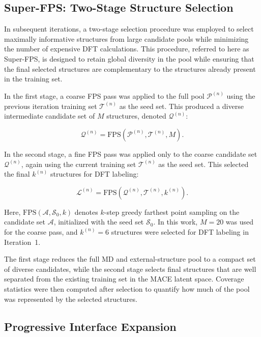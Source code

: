 \documentclass[12pt,a4paper,oneside]{book}
\begin{document}
\subsection{Super-FPS: Two-Stage Structure Selection}

In subsequent iterations, a two-stage selection procedure was employed to
select maximally informative structures from large candidate pools while
minimizing the number of expensive DFT calculations. This procedure, referred
to here as Super-FPS, is designed to retain global diversity in the pool while
ensuring that the final selected structures are complementary to the structures
already present in the training set.

In the first stage, a coarse FPS pass was applied to the full pool
$\mathcal{P}^{(n)}$ using the previous iteration training set
$\mathcal{T}^{(n)}$ as the seed set. This produced a diverse intermediate
candidate set of $M$ structures, denoted $\mathcal{Q}^{(n)}$:

\begin{equation}
    \mathcal{Q}^{(n)} =
    \mathrm{FPS}\!\left(\mathcal{P}^{(n)},\mathcal{T}^{(n)},M\right).
\end{equation}

In the second stage, a fine FPS pass was applied only to the coarse candidate
set $\mathcal{Q}^{(n)}$, again using the current training set
$\mathcal{T}^{(n)}$ as the seed set. This selected the final
$k^{(n)}$ structures for DFT labeling:

\begin{equation}
    \mathcal{L}^{(n)} =
    \mathrm{FPS}\!\left(\mathcal{Q}^{(n)},\mathcal{T}^{(n)},k^{(n)}\right).
\end{equation}

Here, $\mathrm{FPS}(\mathcal{A},\mathcal{S}_0,k)$ denotes $k$-step greedy
farthest point sampling on the candidate set $\mathcal{A}$, initialized with
the seed set $\mathcal{S}_0$. In this work, $M=20$ was used for the coarse
pass, and $k^{(n)}=6$ structures were selected for DFT labeling in Iteration~1.

The first stage reduces the full MD and external-structure pool to a compact
set of diverse candidates, while the second stage selects final structures
that are well separated from the existing training set in the MACE latent space. Coverage statistics were then computed after selection to
quantify how much of the pool was represented by the selected structures.
\subsection{Progressive Interface Expansion}
\end{document}
